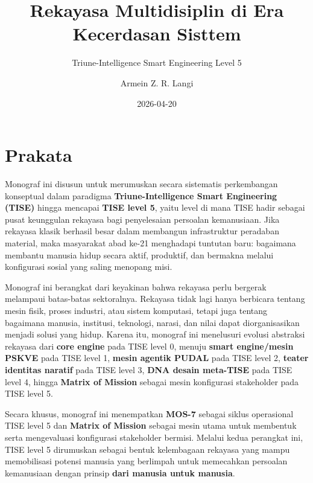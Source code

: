 \documentclass[
  letterpaper,
  DIV=11,
  numbers=noendperiod]{scrreprt}
\title{Rekayasa Multidisiplin di Era Kecerdasan Sisttem}
\subtitle{Triune-Intelligence Smart Engineering Level 5}
\author{Armein Z. R. Langi}
\date{2026-04-20}
\renewcommand*\contentsname{Table of contents}
\newcommand\contentsname{Table of contents}
\begin{document}
\maketitle

\renewcommand*\contentsname{Table of contents}
{
\setcounter{tocdepth}{2}
\tableofcontents
}


\chapter*{Prakata}\label{prakata}


Monograf ini disusun untuk merumuskan secara sistematis perkembangan
konseptual dalam paradigma \textbf{Triune-Intelligence Smart Engineering
(TISE)} hingga mencapai \textbf{TISE level 5}, yaitu level di mana TISE
hadir sebagai pusat keunggulan rekayasa bagi penyelesaian persoalan
kemanusiaan. Jika rekayasa klasik berhasil besar dalam membangun
infrastruktur peradaban material, maka masyarakat abad ke-21 menghadapi
tuntutan baru: bagaimana membantu manusia hidup secara aktif, produktif,
dan bermakna melalui konfigurasi sosial yang saling menopang misi.

Monograf ini berangkat dari keyakinan bahwa rekayasa perlu bergerak
melampaui batas-batas sektoralnya. Rekayasa tidak lagi hanya berbicara
tentang mesin fisik, proses industri, atau sistem komputasi, tetapi juga
tentang bagaimana manusia, institusi, teknologi, narasi, dan nilai dapat
diorganisasikan menjadi solusi yang hidup. Karena itu, monograf ini
menelusuri evolusi abstraksi rekayasa dari \textbf{core engine} pada
TISE level 0, menuju \textbf{smart engine/mesin PSKVE} pada TISE level
1, \textbf{mesin agentik PUDAL} pada TISE level 2, \textbf{teater
identitas naratif} pada TISE level 3, \textbf{DNA desain meta-TISE} pada
TISE level 4, hingga \textbf{Matrix of Mission} sebagai mesin
konfigurasi stakeholder pada TISE level 5.

Secara khusus, monograf ini menempatkan \textbf{MOS-7} sebagai siklus
operasional TISE level 5 dan \textbf{Matrix of Mission} sebagai mesin
utama untuk membentuk serta mengevaluasi konfigurasi stakeholder
bermisi. Melalui kedua perangkat ini, TISE level 5 dirumuskan sebagai
bentuk kelembagaan rekayasa yang mampu memobilisasi potensi manusia yang
berlimpah untuk memecahkan persoalan kemanusiaan dengan prinsip
\textbf{dari manusia untuk manusia}.
\end{document}
